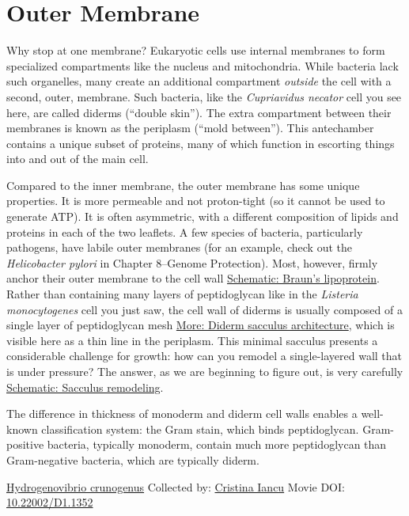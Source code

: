 \documentclass[]{tufte-book}
\begin{document}
\hypertarget{outer-membrane}{%
\section{Outer Membrane}\label{outer-membrane}}

Why stop at one membrane? Eukaryotic cells use internal membranes to form specialized compartments like the nucleus and mitochondria. While bacteria lack such organelles, many create an additional compartment \emph{outside} the cell with a second, outer, membrane. Such bacteria, like the \emph{Cupriavidus necator} cell you see here, are called diderms (``double skin''). The extra compartment between their membranes is known as the periplasm (``mold between''). This antechamber contains a unique subset of proteins, many of which function in escorting things into and out of the main cell.

Compared to the inner membrane, the outer membrane has some unique properties. It is more permeable and not proton-tight (so it cannot be used to generate ATP). It is often asymmetric, with a different composition of lipids and proteins in each of the two leaflets. A few species of bacteria, particularly pathogens, have labile outer membranes (for an example, check out the \emph{Helicobacter pylori} in Chapter 8--Genome Protection). Most, however, firmly anchor their outer membrane to the cell wall \protect\hyperlink{Brauns_lipoprotein}{Schematic: Braun's lipoprotein}. Rather than containing many layers of peptidoglycan like in the \emph{Listeria monocytogenes} cell you just saw, the cell wall of diderms is usually composed of a single layer of peptidoglycan mesh \protect\hyperlink{Diderm_sacculus_architecture}{More: Diderm sacculus architecture}, which is visible here as a thin line in the periplasm. This minimal sacculus presents a considerable challenge for growth: how can you remodel a single-layered wall that is under pressure? The answer, as we are beginning to figure out, is very carefully \protect\hyperlink{Sacculus_remodeling}{Schematic: Sacculus remodeling}.

The difference in thickness of monoderm and diderm cell walls enables a well-known classification system: the Gram stain, which binds peptidoglycan. Gram-positive bacteria, typically monoderm, contain much more peptidoglycan than Gram-negative bacteria, which are typically diderm.



\hypertarget{htmlwidget-ed49c97e1e661d4c14b2}{}

\label{fig:2-3}\protect\hyperlink{tree}{Hydrogenovibrio crunogenus} Collected by: \protect\hyperlink{cristina_iancu}{Cristina Iancu} Movie DOI: \href{https://doi.org/10.22002/D1.1352}{10.22002/D1.1352}
\end{document}
